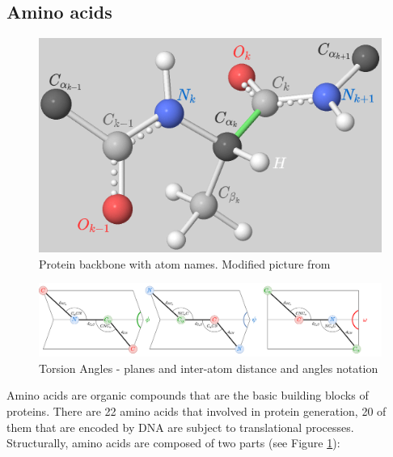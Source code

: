 
\subsection{Amino acids}

\begin{figure}
    \centering
    \includegraphics[scale=0.5]{imgs_tomas/backbone.png}
    \caption{Protein backbone with atom names. Modified picture from \cite{ramachandran}}
    \label{fig:backbone0}
\end{figure}

\begin{figure}
    \centering
    \includegraphics[width=\linewidth]{imgs_tomas/torsion.png}
    \caption{Torsion Angles - planes and inter-atom distance and angles notation}
    \label{fig:torsion}
\end{figure}

Amino acids are organic compounds that are the basic building blocks of proteins. There are 22 amino acids that involved in protein generation, 20 of them that are encoded by DNA are subject to translational processes. Structurally, amino acids are composed of two parts (see Figure \ref{fig:backbone0}):

